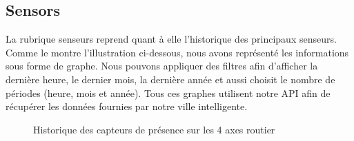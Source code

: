 \subsection{Sensors}
La rubrique senseurs reprend quant à elle l’historique des principaux senseurs. Comme le montre l’illustration ci-dessous, nous avons représenté les informations sous forme de graphe. Nous pouvons appliquer des filtres afin d’afficher la dernière heure, le dernier mois, la dernière année et aussi choisit le nombre de périodes (heure, mois et année). Tous ces graphes utilisent notre API afin de récupérer les données fournies par notre ville intelligente. 
\begin{figure}[H]
    \begin{center}
        \caption{Historique des capteurs de présence sur les 4 axes routier}
    \end{center}
\end{figure}

